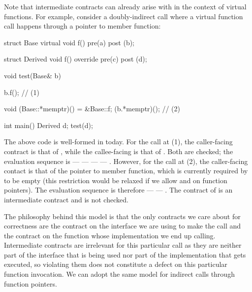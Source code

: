 Note that intermediate contracts can already arise with \cite{P2900R8} in the context of virtual functions. For example, consider a doubly-indirect call where a virtual function call happens through a pointer to member function:
\begin{codeblock}
struct Base {
  virtual void f() pre(a) post (b);
}

struct Derived {
  void f() override pre(c) post (d);
}

void test(Base& b) {
  b.f();  // (1)
  
  void (Base::*memptr)() = &Base::f;
  (b.*memptr)();  // (2)
}

int main() {
  Derived d;
  test(d);
}
\end{codeblock}
The above code is well-formed in \cite{P2900R8} today. For the call at (1), the caller-facing contract is that of , while the callee-facing is that of . Both are checked; the evaluation sequence is  ---  ---  ---  --- . However, for the call at (2), the caller-facing contact is that of the pointer to member function, which is currently required by \cite{P2900R8} to be empty (this restriction would be relaxed if we allow  and  on function pointers). The evaluation sequence is therefore  ---  --- . The contract of  is an intermediate contract and is not checked.

The philosophy behind this model is that the only contracts we care about for correctness are the contract on the interface we are using to make the call and the contract on the function whose implementation we end up calling. Intermediate contracts are irrelevant for this particular call as they are neither part of the  interface that is being used nor part of the implementation that gets executed, so violating them does not constitute a defect on this particular function invocation. We can adopt the same model for indirect calls through function pointers.


